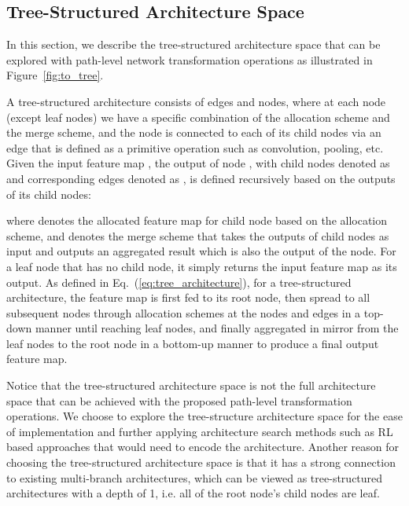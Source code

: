 \documentclass{article}
\begin{document}
\subsection{Tree-Structured Architecture Space}\label{sec:tree_arch_space}

In this section, we describe the tree-structured architecture space that can be explored with path-level network transformation operations as illustrated in Figure~\ref{fig:to_tree}. 

A tree-structured architecture consists of edges and nodes, where at each node (except leaf nodes) we have a specific combination of the allocation scheme and the merge scheme, and the node is connected to each of its child nodes via an edge that is defined as a primitive operation such as convolution, pooling, etc.
Given the input feature map , the output of node , with  child nodes denoted as  and  corresponding edges denoted as , is defined recursively based on the outputs of its child nodes:
{\small

}where  denotes the allocated feature map for  child node based on the allocation scheme, and  denotes the merge scheme that takes the outputs of child nodes as input and outputs an aggregated result which is also the output of the node. For a leaf node that has no child node, it simply returns the input feature map as its output. As defined in Eq.~(\ref{eq:tree_architecture}), for a tree-structured architecture, the feature map is first fed to its root node, then spread to all subsequent nodes through allocation schemes at the nodes and edges in a top-down manner until reaching leaf nodes, and finally aggregated in mirror from the leaf nodes to the root node in a bottom-up manner to produce a final output feature map.


Notice that the tree-structured architecture space is not the full architecture space that can be achieved with the proposed path-level transformation operations. We choose to explore the tree-structure architecture space for the ease of implementation and further applying architecture search methods such as RL based approaches \cite{cai2018efficient} that would need to encode the architecture. Another reason for choosing the tree-structured architecture space is that it has a strong connection to existing multi-branch architectures, which can be viewed as tree-structured architectures with a depth of 1, i.e. all of the root node's child nodes are leaf. 
\end{document}
